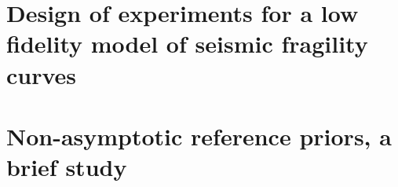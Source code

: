 \documentclass[a4paper]{book}
\renewcommand{\familydefault}{\sfdefault}
\begin{document}


\chapter{Design of experiments for a low fidelity model of seismic fragility curves}\label{app:chap:ESAIM}




\chapter{Non-asymptotic reference priors, a brief study}\label{app:chap:nonasympt}








 

\printbibliography[heading=chapter,title=Bibliography]

\fancyhead{}
\newpage
\pagestyle{empty}
\backmatter
\ \cleardoublepage
\ \newpage
\renewcommand{\familydefault}{\sfdefault}
%
%
%
%
%
\end{document}
